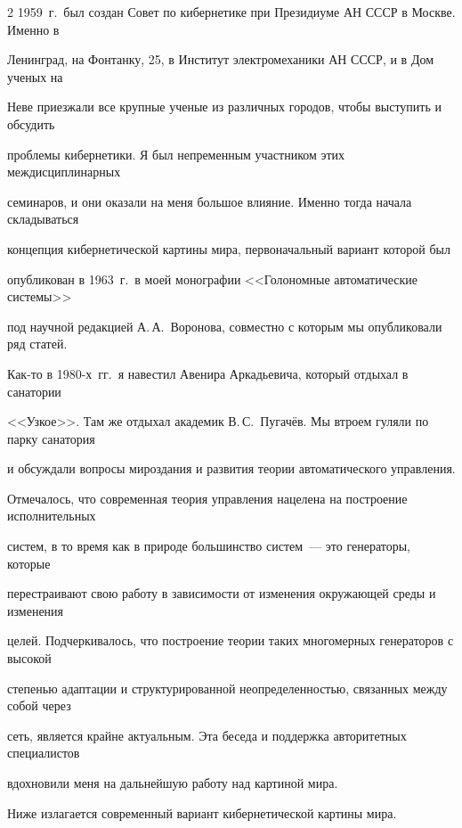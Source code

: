 \begin{multicols}{2}
1959~г.\ был создан Совет по кибернетике при Президиуме АН СССР в Москве. Именно в 


Ленинград, на Фонтанку, 25, в Институт электромеханики АН СССР, и в Дом ученых на 


Неве приезжали все крупные ученые из различных городов, чтобы выступить и обсудить 


проблемы кибернетики. Я был непременным участником этих междисциплинарных 


семинаров, и они оказали на меня большое влияние. Именно тогда начала складываться 


концепция кибернетической картины мира, первоначальный вариант которой был 


опубликован в 1963~г.\ в моей монографии <<Голономные автоматические сис\-те\-мы>> 


под научной редакцией А.\,А.~Воронова, совместно с которым мы опубликовали ряд статей.


      


      Как-то в 1980-х~гг.\ я навестил Авенира Аркадьевича, который отдыхал в санатории 


<<Узкое>>. Там же отдыхал академик В.\,С.~Пугачёв. Мы втроем гуляли по парку санатория 


и обсуждали вопросы мироздания и развития теории автоматического управ\-ле\-ния. 


Отмечалось, что современная теория управ\-ле\-ния нацелена на построение исполнительных 


систем, в то время как в природе большинство систем~--- это генераторы, которые 


перестраивают свою работу в зависимости от изменения окружающей среды и изменения 


целей. Подчеркивалось, что построение теории таких многомерных генераторов с высокой 


степенью адаптации и структурированной неопределенностью, связанных между собой через 


сеть, является крайне актуальным. Эта беседа и поддержка авторитетных специалистов 


вдохновили меня на дальнейшую работу над картиной мира.





Ниже излагается современный вариант кибернетической картины мира.






\end{multicols}
